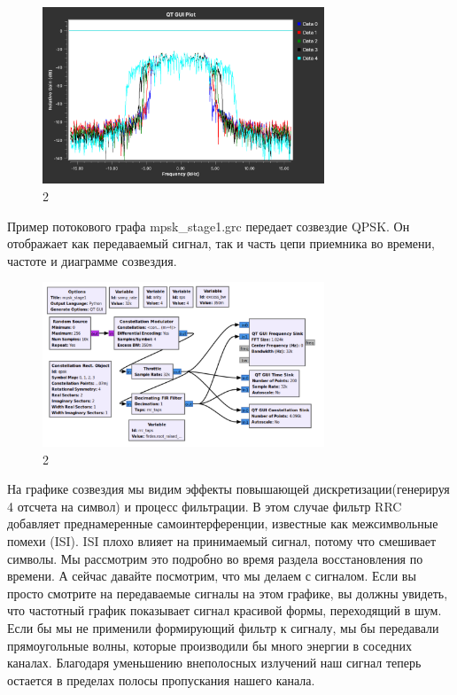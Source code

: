 \documentclass[10pt,a4paper,oneside]{article}
\begin{document}
\begin{figure}[H]
        \centering
        \includegraphics[width=0.75\textwidth]{pics/1.png}
        \caption{2}
        \label{fig:first}
\end{figure}

Пример потокового графа mpsk_stage1.grc передает созвездие QPSK. Он отображает как передаваемый сигнал, так и часть цепи приемника во времени, частоте и диаграмме созвездия.

\begin{figure}[H]
        \centering
        \includegraphics[width=0.75\textwidth]{pics/2.png}
        \caption{2}
        \label{fig:first}
\end{figure}

На графике созвездия мы видим эффекты повышающей дискретизации(генерируя 4 отсчета на символ) и процесс фильтрации. В этом случае фильтр RRC добавляет преднамеренные самоинтерференции, известные как межсимвольные помехи (ISI). ISI плохо влияет на принимаемый сигнал, потому что смешивает символы. Мы рассмотрим это подробно во время раздела восстановления по времени. А сейчас давайте посмотрим, что мы делаем с сигналом. Если вы просто смотрите на передаваемые сигналы на этом графике, вы должны увидеть, что частотный график показывает сигнал красивой формы, переходящий в шум. Если бы мы не применили формирующий фильтр к сигналу, мы бы передавали прямоугольные волны, которые производили бы много энергии в соседних каналах. Благодаря уменьшению внеполосных излучений наш сигнал теперь остается в пределах полосы пропускания нашего канала.
\end{document}
